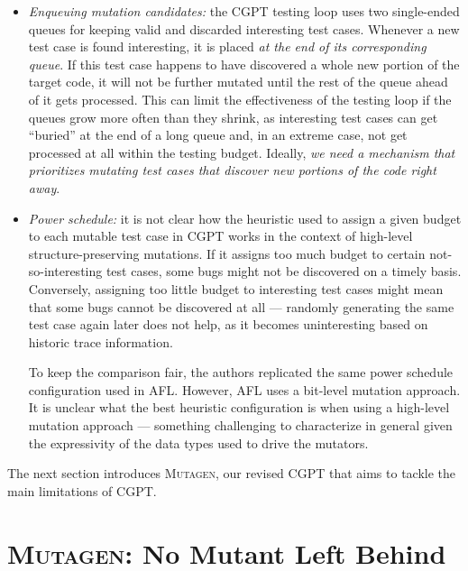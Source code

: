 \documentclass[sigconf, anonymous, review]{acmart}
\newcommand{\mutagen}{\textsc{Mutagen}\xspace}
\begin{document}
\begin{itemize}
\item \emph{Enqueuing mutation candidates:}
%
the CGPT testing loop uses two single-ended queues for keeping valid and
discarded interesting test cases.
%
Whenever a new test case is found interesting, it is placed \emph{at the end of
  its corresponding queue}.
%
If this test case happens to have discovered a whole new portion of the target
code, it will not be further mutated until the rest of the queue ahead of it
gets processed.
%
This can limit the effectiveness of the testing loop if the queues grow more
often than they shrink, as interesting test cases can get ``buried'' at the end
of a long queue and,
%
%
in an extreme case, not get processed at all within the testing budget.
%
Ideally, \emph{we need a mechanism that prioritizes mutating test cases that
  discover new portions of the code right away}.
%
%

\item \emph{Power schedule:}
%
it is not clear how the heuristic used to assign a given budget to each mutable
test case in CGPT works in the context of high-level structure-preserving
mutations.
%
If it assigns too much budget to certain not-so-interesting test cases, some
bugs might not be discovered on a timely basis.
%
Conversely, assigning too little budget to interesting test cases might mean
that some bugs cannot be discovered at all --- randomly generating the same test
case again later does not help, as it becomes uninteresting based on historic
trace information.

To keep the comparison fair, the authors replicated the same power schedule
configuration used in AFL.
%
However, AFL uses a bit-level mutation approach.
%
It is unclear what the best heuristic configuration is when using a high-level
mutation approach --- something challenging to characterize in general given the
expressivity of the data types used to drive the mutators.
\end{itemize}

The next section introduces \mutagen, our revised CGPT that aims to tackle the
main limitations of CGPT.


\section{\mutagen: No Mutant Left Behind}
\label{sec:mutagen}
\end{document}

